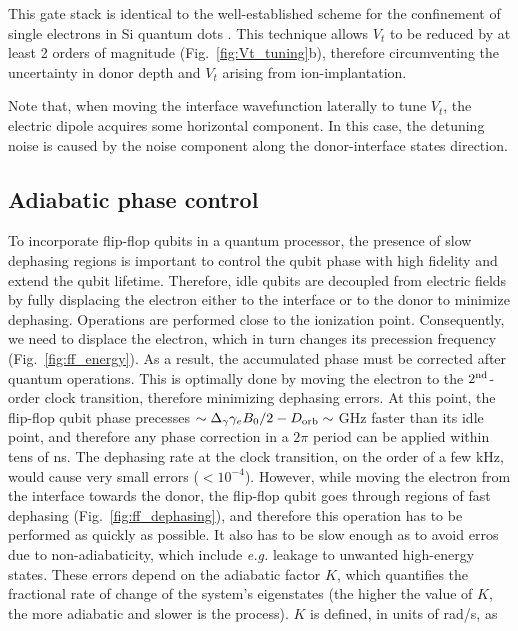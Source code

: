 This gate stack is identical to the well-established scheme for the confinement of single electrons in Si quantum dots \cite{Veldhorst2014}. This technique allows $V_t$ to be reduced by at least 2 orders of magnitude (Fig.~\ref{fig:Vt_tuning}b), therefore circumventing the uncertainty in donor depth and $V_t$ arising from ion-implantation.

Note that, when moving the interface wavefunction laterally to tune $V_t$, the electric dipole acquires some horizontal component. In this case, the detuning noise is caused by the noise component along the donor-interface states direction. 

\subsection{Adiabatic phase control} \label{sec:adiabatic_pc}

To incorporate flip-flop qubits in a quantum processor, the presence of slow dephasing regions is important to control the qubit phase with high fidelity and extend the qubit lifetime. Therefore, idle qubits are decoupled from electric fields by fully displacing the electron either to the interface or to the donor to minimize dephasing. Operations are performed close to the ionization point. 
Consequently, we need to displace the electron, which in turn changes its precession frequency (Fig.~\ref{fig:ff_energy}). As a result, the accumulated phase must be corrected after quantum operations. This is optimally done by moving the electron to the $2^{\rm nd}$-order clock transition, therefore minimizing dephasing errors. At this point, the flip-flop qubit phase precesses $\sim\Delta_\gamma\gamma_e B_0/2-D_{\rm orb}\sim\ $GHz faster than its idle point, and therefore any phase correction in a $2\pi$ period can be applied within tens of ns. The dephasing rate at the clock transition, on the order of a few kHz, would cause very small errors ($<10^{-4}$). However, while moving the electron from the interface towards the donor, the flip-flop qubit goes through regions of fast dephasing (Fig.~\ref{fig:ff_dephasing}), and therefore this operation has to be performed as quickly as possible. It also has to be slow enough as to avoid erros due to non-adiabaticity, which include \textit{e.g.} leakage to unwanted high-energy states. These errors depend on the adiabatic factor $K$, which quantifies the fractional rate of change of the system's eigenstates (the higher the value of $K$, the more adiabatic and slower is the process). $K$ is defined, in units of rad/s, as

